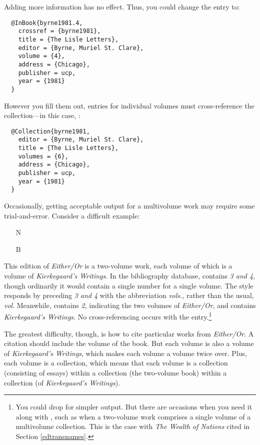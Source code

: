 \documentclass[11pt,letterpaper,oneside]{article}
\begin{document}
Adding more information has no effect. Thus, you could change the
entry to:

\begin{lstlisting}
  @InBook{byrne1981.4,
    crossref = {byrne1981},
    title = {The Lisle Letters},
    editor = {Byrne, Muriel St. Clare},
    volume = {4},
    address = {Chicago},
    publisher = ucp,
    year = {1981}
  }
\end{lstlisting}

\noindent However you fill them out, entries for individual volumes
must cross-reference the col\-lec\-tion---in this case,
:

\begin{lstlisting}
  @Collection{byrne1981,
    editor = {Byrne, Muriel St. Clare},
    title = {The Lisle Letters},
    volumes = {6},
    address = {Chicago},
    publisher = ucp,
    year = {1981}
  }
\end{lstlisting}

Occasionally, getting acceptable output for a multivolume work may
require some trial-and-error. Consider a difficult example:

\begin{itemize}
\item[N] 

\item[B] 
\end{itemize}

\noindent This edition of \textit{Either/Or} is a two-volume work,
each volume of which is a volume of \textit{Kierkegaard's Writings}.
In the bibliography database,  contains \textit{3 and
4}, though ordinarily it would contain a single number for a single
volume. The style responds by preceding \textit{3 and 4} with the
abbreviation \textit{vols.}, rather than the usual, \textit{vol}.
Meanwhile,  contains \textit{2}, indicating the two
volumes of \textit{Either/Or}, and  contains
\textit{Kierkegaard's Writings}. No cross-referencing occurs with the
entry.\footnote{You could drop  for simpler output.
But there are occasions when you need it along with
, such as when a two-volume work comprises a single
volume of a multivolume collection. This is the case with \textit{The
Wealth of Nations} cited in Section \ref{edtransnames}.}

The greatest difficulty, though, is how to cite particular works from
\textit{Either/Or}. A citation should include the volume of the book.
But each volume is also a volume of \textit{Kierkegaard's Writings},
which makes each volume a volume twice over. Plus, each volume is a
collection, which means that each volume is a collection (consisting
of essays) within a collection (the two-volume book) within a
collection (of \textit{Kierkegaard's Writings}).
\end{document}
